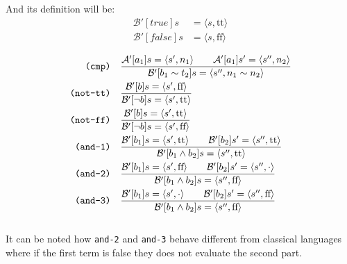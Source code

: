 \documentclass{article}
\newcommand{\lf}{\text{f}\text{f}}
\newcommand{\lt}{\text{t}\text{t}}
\begin{document}
And its definition will be:
$$ 
    \begin{aligned}
        \mathcal{B}'[true]s  &= \langle s, \lt\rangle \\
        \mathcal{B}'[false]s &= \langle s, \lf \rangle \\
    \end{aligned}
$$
$$
\begin{aligned}
    \texttt{(cmp)} \quad & \frac
        {\mathcal{A}'[a_1]s = \langle s', n_1\rangle \quad\quad \mathcal{A}'[a_1]s' = \langle s'', n_2\rangle}
        {\mathcal{B}'[b_1 \sim t_2]s = \langle s'', n_1 \sim n_2 \rangle} \\
    \texttt{(not-\lt)} \quad & \frac
        {\mathcal{B}'[b]s = \langle s', \lf\rangle}
        {\mathcal{B}'[\lnot b]s = \langle s', \lt \rangle} \\
    \texttt{(not-\lf)} \quad & \frac
        {\mathcal{B}'[b]s = \langle s', \lt\rangle}
        {\mathcal{B}'[\lnot b]s = \langle s', \lf \rangle} \\
    \texttt{(and-1)} \quad & \frac
        {\mathcal{B}'[b_1]s = \langle s', \lt\rangle \quad\quad \mathcal{B}'[b_2]s' = \langle s'', \lt\rangle}
        {\mathcal{B}'[b_1 \land b_2]s = \langle s'', \lt \rangle} \\
    \texttt{(and-2)} \quad & \frac
        {\mathcal{B}'[b_1]s = \langle s',\lf\rangle \quad\quad \mathcal{B}'[b_2]s' = \langle s'', \cdot\rangle}
        {\mathcal{B}'[b_1 \land b_2]s = \langle s'', \lf \rangle} \\
    \texttt{(and-3)} \quad & \frac
        {\mathcal{B}'[b_1]s = \langle s', \cdot\rangle \quad\quad \mathcal{B}'[b_2]s' = \langle s'', \lf\rangle}
        {\mathcal{B}'[b_1 \land b_2]s = \langle s'', \lf \rangle} \\
\end{aligned}
$$
\\
It can be noted how \texttt{and-2} and \texttt{and-3} behave different from classical languages where if the first term is false they does not evaluate the second part.
\end{document}
